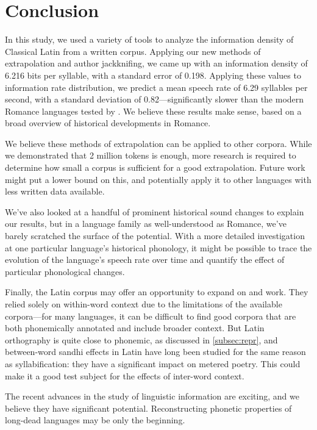\documentclass[12pt,twoside]{article}
\begin{document}
\section{Conclusion}
\label{sec:concl}

In this study, we used a variety of tools to analyze the information density of Classical Latin from a written corpus. Applying our new methods of extrapolation and author jackknifing, we came up with an information density of 6.216 bits per syllable, with a standard error of 0.198. Applying these values to  information rate distribution, we predict a mean speech rate of 6.29 syllables per second, with a standard deviation of 0.82---significantly slower than the modern Romance languages tested by \citeauthor{coupé}. We believe these results make sense, based on a broad overview of historical developments in Romance.

We believe these methods of extrapolation can be applied to other corpora. While we demonstrated that 2 million tokens is enough, more research is required to determine how small a corpus is sufficient for a good extrapolation. Future work might put a lower bound on this, and potentially apply it to other languages with less written data available.

We've also looked at a handful of prominent historical sound changes to explain our results, but in a language family as well-understood as Romance, we've barely scratched the surface of the potential. With a more detailed investigation at one particular language's historical phonology, it might be possible to trace the evolution of the language's speech rate over time and quantify the effect of particular phonological changes.

Finally, the Latin corpus may offer an opportunity to expand on \citet{oh} and  work. They relied solely on within-word context due to the limitations of the available corpora---for many languages, it can be difficult to find good corpora that are both phonemically annotated and include broader context. But Latin orthography is quite close to phonemic, as discussed in \ref{subsec:repr}, and between-word sandhi effects in Latin have long been studied for the same reason as syllabification: they have a significant impact on metered poetry. This could make it a good test subject for the effects of inter-word context.

The recent advances in the study of linguistic information are exciting, and we believe they have significant potential. Reconstructing phonetic properties of long-dead languages may be only the beginning.
\end{document}
